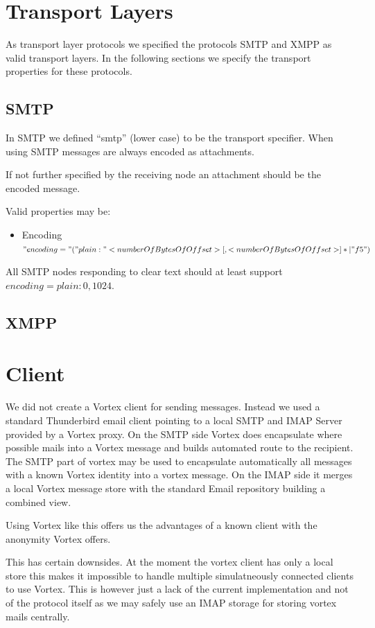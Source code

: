 \section{Transport Layers}
As transport layer protocols we specified the protocols SMTP and XMPP as valid transport layers. In the following sections we specify the transport properties for these protocols.

\subsection{SMTP}
In SMTP we defined ``smtp'' (lower case) to be the transport specifier. When using SMTP messages are always encoded as attachments. 

If not further specified by the receiving node an attachment should be the encoded message. 

Valid properties may be:
\begin{itemize}
	\item Encoding $"encoding="("plain:"<numberOfBytesOfOffset>[,<numberOfBytesOfOffset>]*|"f5")$
\end{itemize}

All SMTP nodes responding to clear text should at least support $encoding=plain:0,1024$.


\subsection{XMPP}

\section{Client}
We did not create a Vortex client for sending messages. Instead we used a standard Thunderbird email client pointing to a local SMTP and IMAP Server provided by a Vortex proxy. On the SMTP side Vortex does encapsulate where possible mails into a Vortex message and builds automated route to the recipient. The SMTP part of vortex may be used to encapsulate automatically all messages with a known Vortex identity into a vortex message. On the IMAP side it merges a local Vortex message store with the standard Email repository building a combined view.

Using Vortex like this offers us the advantages of a known client with the anonymity Vortex offers.

This has certain downsides. At the moment the vortex client has only a local store this makes it impossible to handle multiple simulatneously connected clients to use Vortex. This is however just a lack of the current implementation and not of the protocol itself as we may safely use an IMAP storage for storing vortex mails centrally.

